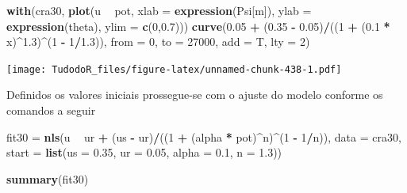 \documentclass[
]{book}
\newenvironment{Shaded}{\begin{snugshade}}{\end{snugshade}}
\newcommand{\DataTypeTok}[1]{\textcolor[rgb]{0.13,0.29,0.53}{#1}}
\newcommand{\DecValTok}[1]{\textcolor[rgb]{0.00,0.00,0.81}{#1}}
\newcommand{\FloatTok}[1]{\textcolor[rgb]{0.00,0.00,0.81}{#1}}
\newcommand{\KeywordTok}[1]{\textcolor[rgb]{0.13,0.29,0.53}{\textbf{#1}}}
\newcommand{\NormalTok}[1]{#1}
\newcommand{\OperatorTok}[1]{\textcolor[rgb]{0.81,0.36,0.00}{\textbf{#1}}}
\newcommand{\StringTok}[1]{\textcolor[rgb]{0.31,0.60,0.02}{#1}}
\begin{document}
\begin{Shaded}
\begin{Highlighting}[]
\KeywordTok{with}\NormalTok{(cra30, }\KeywordTok{plot}\NormalTok{(u }\OperatorTok{~}\StringTok{ }\NormalTok{pot, }\DataTypeTok{xlab =} \KeywordTok{expression}\NormalTok{(Psi[m]), }
                 \DataTypeTok{ylab =} \KeywordTok{expression}\NormalTok{(theta),}
                 \DataTypeTok{ylim =} \KeywordTok{c}\NormalTok{(}\DecValTok{0}\NormalTok{,}\FloatTok{0.7}\NormalTok{))) }
        \KeywordTok{curve}\NormalTok{(}\FloatTok{0.05} \OperatorTok{+}\StringTok{ }\NormalTok{(}\FloatTok{0.35} \OperatorTok{-}\StringTok{ }\FloatTok{0.05}\NormalTok{)}\OperatorTok{/}\NormalTok{((}\DecValTok{1} \OperatorTok{+}\StringTok{ }\NormalTok{(}\FloatTok{0.1} \OperatorTok{*}\StringTok{ }\NormalTok{x)}\OperatorTok{^}\FloatTok{1.3}\NormalTok{)}\OperatorTok{^}\NormalTok{(}\DecValTok{1} \OperatorTok{-}\StringTok{ }\DecValTok{1}\OperatorTok{/}\FloatTok{1.3}\NormalTok{)), }\DataTypeTok{from =} \DecValTok{0}\NormalTok{, }
  \DataTypeTok{to =} \DecValTok{27000}\NormalTok{, }\DataTypeTok{add =}\NormalTok{ T, }\DataTypeTok{lty =} \DecValTok{2}\NormalTok{)}
\end{Highlighting}
\end{Shaded}

\texttt{[image: TudodoR\_files/figure-latex/unnamed-chunk-438-1.pdf]}

Definidos os valores iniciais prossegue-se com o ajuste do modelo conforme os comandos a seguir

\begin{Shaded}
\begin{Highlighting}[]
\NormalTok{fit30 =}\StringTok{ }\KeywordTok{nls}\NormalTok{(u }\OperatorTok{~}\StringTok{ }\NormalTok{ur }\OperatorTok{+}\StringTok{ }\NormalTok{(us }\OperatorTok{-}\StringTok{ }\NormalTok{ur)}\OperatorTok{/}\NormalTok{((}\DecValTok{1} \OperatorTok{+}\StringTok{ }\NormalTok{(alpha }\OperatorTok{*}\StringTok{ }\NormalTok{pot)}\OperatorTok{^}\NormalTok{n)}\OperatorTok{^}\NormalTok{(}\DecValTok{1} \OperatorTok{-}\StringTok{ }\DecValTok{1}\OperatorTok{/}\NormalTok{n)), }\DataTypeTok{data =}\NormalTok{ cra30, }\DataTypeTok{start =} \KeywordTok{list}\NormalTok{(}\DataTypeTok{us =} \FloatTok{0.35}\NormalTok{, }\DataTypeTok{ur =} \FloatTok{0.05}\NormalTok{, }\DataTypeTok{alpha =} \FloatTok{0.1}\NormalTok{, }\DataTypeTok{n =} \FloatTok{1.3}\NormalTok{))}

\KeywordTok{summary}\NormalTok{(fit30)}
\end{Highlighting}
\end{Shaded}
\end{document}
